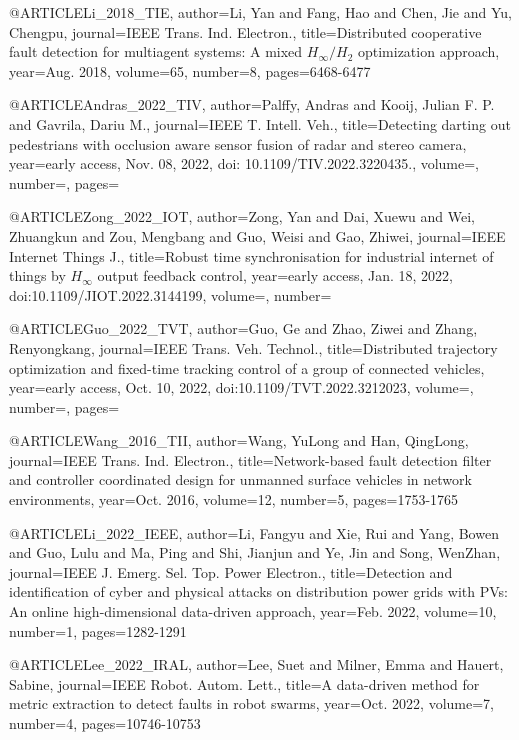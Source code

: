@ARTICLE{Li_2018_TIE,
  author={Li, Yan and Fang, Hao and Chen, Jie and Yu, Chengpu},
  journal={IEEE Trans. Ind. Electron.}, 
  title={Distributed cooperative fault detection for multiagent systems: A mixed ${H}_{\infty }/{H}_2$ optimization approach}, 
  year={Aug. 2018},
  volume={65},
  number={8},
  pages={6468-6477}}

@ARTICLE{Andras_2022_TIV,
  author={Palffy, Andras and Kooij, Julian F. P. and Gavrila, Dariu M.},
  journal={IEEE T. Intell. Veh.}, 
  title={Detecting darting out pedestrians with occlusion aware sensor fusion of radar and stereo camera}, 
  year={early access, Nov. 08, 2022, doi: 10.1109/TIV.2022.3220435.},
  volume={},
  number={},
  pages={}}

@ARTICLE{Zong_2022_IOT,
  author={Zong, Yan and Dai, Xuewu and Wei, Zhuangkun and Zou, Mengbang and Guo, Weisi and Gao, Zhiwei},
  journal={IEEE Internet Things J.}, 
  title={Robust time synchronisation for industrial internet of things by ${H}_{\infty}$ output feedback control}, 
  year={early access, Jan. 18, 2022, doi:10.1109/JIOT.2022.3144199},
  volume={},
  number={}}

@ARTICLE{Guo_2022_TVT,
  author={Guo, Ge and Zhao, Ziwei and Zhang, Renyongkang},
  journal={IEEE Trans. Veh. Technol.}, 
  title={Distributed trajectory optimization and fixed-time tracking control of a group of connected vehicles}, 
  year={early access, Oct. 10, 2022, doi:10.1109/TVT.2022.3212023},
  volume={},
  number={},
  pages={}}

@ARTICLE{Wang_2016_TII,
  author={Wang, YuLong and Han, QingLong},
  journal={IEEE Trans. Ind. Electron.}, 
  title={Network-based fault detection filter and controller coordinated design for unmanned surface vehicles in network environments}, 
  year={Oct. 2016},
  volume={12},
  number={5},
  pages={1753-1765}}

@ARTICLE{Li_2022_IEEE,
  author={Li, Fangyu and Xie, Rui and Yang, Bowen and Guo, Lulu and Ma, Ping and Shi, Jianjun and Ye, Jin and Song, WenZhan},
  journal={IEEE J. Emerg. Sel. Top. Power Electron.}, 
  title={Detection and identification of cyber and physical attacks on distribution power grids with PVs: An online high-dimensional data-driven approach}, 
  year={Feb. 2022},
  volume={10},
  number={1},
  pages={1282-1291}}

@ARTICLE{Lee_2022_IRAL,
  author={Lee, Suet and Milner, Emma and Hauert, Sabine},
  journal={IEEE Robot. Autom. Lett.}, 
  title={A data-driven method for metric extraction to detect faults in robot swarms}, 
  year={Oct. 2022},
  volume={7},
  number={4},
  pages={10746-10753}}

